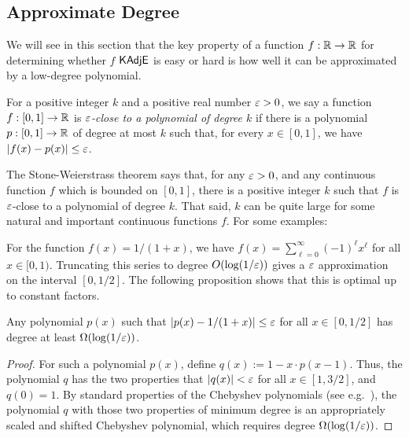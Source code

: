 \subsection{Approximate Degree} \label{subsec:approxdegree}

We will see in this section that the key property of a function $f : {\mathbb R} \to {\mathbb R}$ for determining whether $f$ $\mathsf{KAdjE}$ is easy or hard is how well it can be approximated by a low-degree polynomial.

\begin{definition} \label{def:closetopoly}
For a positive integer $k$ and a positive real number $\varepsilon>0$, we say a function $f : [0,1] \to {\mathbb R}$ is \emph{$\varepsilon$-close to a polynomial of degree $k$} if there is a polynomial $p : [0,1] \to {\mathbb R}$ of degree at most $k$ such that, for every $x \in [0,1]$, we have $|f(x) - p(x)| \leq \varepsilon$.
\end{definition}

The Stone-Weierstrass theorem says that, for any $\varepsilon>0$, and any continuous function $f$ which is bounded on $[0,1]$, there is a positive integer $k$ such that $f$ is $\varepsilon$-close to a polynomial of degree $k$. That said, $k$ can be quite large for some natural and important continuous functions $f$. For some examples:

\begin{example}
For the function $f(x) = 1/(1+x)$, we have $f(x) = \sum_{\ell = 0}^\infty (-1)^\ell x^\ell $ for all $x \in [0,1)$. Truncating this series to degree $O(\log(1/\varepsilon) )$ gives a $\varepsilon$ approximation on the interval $[0,1/2]$. The following proposition shows that this is optimal up to constant factors.
\end{example}

\begin{proposition}
Any polynomial $p(x)$ such that $|p(x) - 1/(1+x)| \leq \varepsilon$ for all $x \in [0,1/2]$ has degree at least $\Omega(\log(1/\varepsilon))$.
\end{proposition}

\begin{proof}
For such a polynomial $p(x)$, define $q(x) := 1 - x \cdot p(x-1)$. Thus, the polynomial $q$ has the two properties that $|q(x)| <  \varepsilon$ for all $x \in [1,3/2]$, and $q(0)=1$. By standard properties of the Chebyshev polynomials (see e.g.~\cite[Proposition~2.4]{sachdeva2014faster}), the polynomial $q$ with those two properties of minimum degree is an appropriately scaled and shifted Chebyshev polynomial, which requires degree $\Omega(\log(1/\varepsilon))$.
\end{proof}


